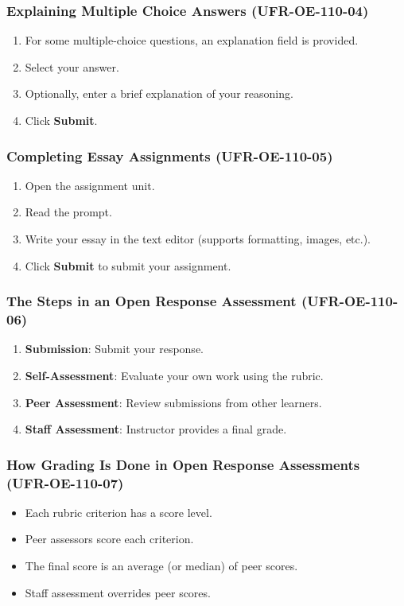 \subsubsection{Explaining Multiple Choice Answers (UFR-OE-110-04)}
\begin{enumerate}
    \item For some multiple-choice questions, an explanation field is provided.
    \item Select your answer.
    \item Optionally, enter a brief explanation of your reasoning.
    \item Click \textbf{Submit}.
\end{enumerate}

\subsubsection{Completing Essay Assignments (UFR-OE-110-05)}
\begin{enumerate}
    \item Open the assignment unit.
    \item Read the prompt.
    \item Write your essay in the text editor (supports formatting, images, etc.).
    \item Click \textbf{Submit} to submit your assignment.
\end{enumerate}

\subsubsection{The Steps in an Open Response Assessment (UFR-OE-110-06)}
\begin{enumerate}
    \item \textbf{Submission}: Submit your response.
    \item \textbf{Self-Assessment}: Evaluate your own work using the rubric.
    \item \textbf{Peer Assessment}: Review submissions from other learners.
    \item \textbf{Staff Assessment}: Instructor provides a final grade.
\end{enumerate}

\subsubsection{How Grading Is Done in Open Response Assessments (UFR-OE-110-07)}
\begin{itemize}
    \item Each rubric criterion has a score level.
    \item Peer assessors score each criterion.
    \item The final score is an average (or median) of peer scores.
    \item Staff assessment overrides peer scores.
\end{itemize}

